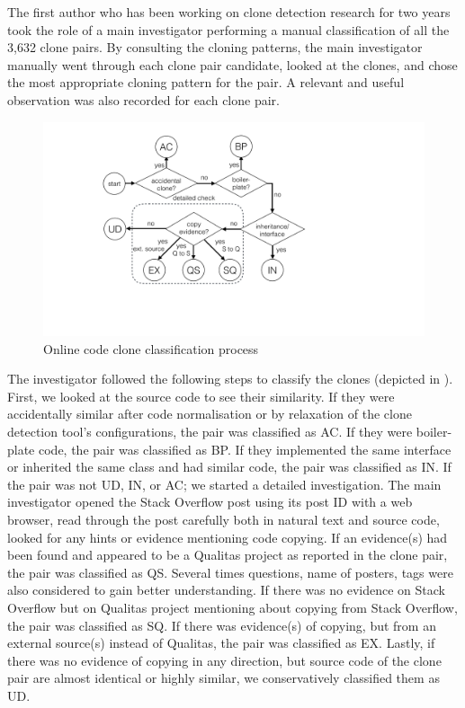 \documentclass[sigconf,review, anonymous]{acmart}
\begin{document}
The first author who has been working on clone detection research for two years took the role of a main investigator performing a manual classification of all the 3,632 clone pairs. By consulting the cloning patterns, the main investigator manually went through each clone pair candidate, looked at the clones, and chose the most appropriate cloning pattern for the pair. A relevant and useful observation was also recorded for each clone pair. 

\begin{figure}
	\centering
	\includegraphics[width=0.8\linewidth]{classification_process}
	\caption{Online code clone classification process}
	\label{fig:classification_process}
\end{figure}

The investigator followed the following steps to classify the clones (depicted in ). First, we looked at the source code to see their similarity. If they were accidentally similar after code normalisation or by relaxation of the clone detection tool's configurations, the pair was classified as AC. If they were boiler-plate code, the pair was classified as BP. If they implemented the same interface or inherited the same class and had similar code, the pair was classified as IN. If the pair was not UD, IN, or AC; we started a detailed investigation. The main investigator opened the Stack Overflow post using its post ID with a web browser, read through the post carefully both in natural text and source code, looked for any hints or evidence mentioning code copying. If an evidence(s) had been found and appeared to be a Qualitas project as reported in the clone pair, the pair was classified as QS. Several times questions, name of posters, tags were also considered to gain better understanding. If there was no evidence on Stack Overflow but on Qualitas project mentioning about copying from Stack Overflow, the pair was classified as SQ. If there was evidence(s) of copying, but from an external source(s) instead of Qualitas, the pair was classified as EX. Lastly, if there was no evidence of copying in any direction, but source code of the clone pair are almost identical or highly similar, we conservatively classified them as UD.
  
\end{document}
